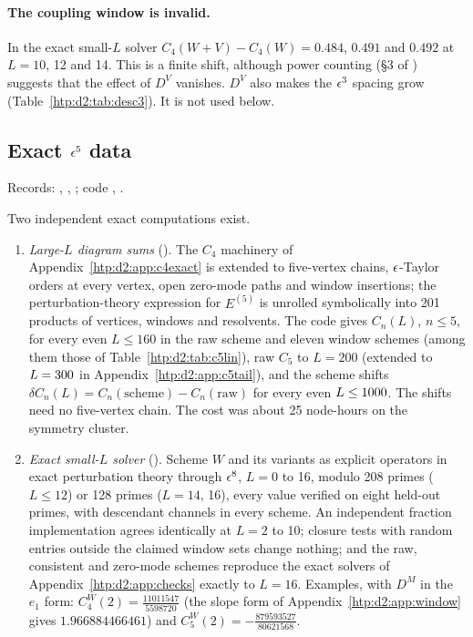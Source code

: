 \paragraph{The coupling window is invalid.} In the exact small-$L$ solver $C_4(W{+}V)-C_4(W)=0.484$, $0.491$ and $0.492$ at
$L=10$, 12 and 14. This is a finite shift, although power counting (\S3 of ) suggests that the effect
of $D^V$ vanishes. $D^V$ also makes the $\epsilon^3$ spacing grow (Table~\ref{htp:d2:tab:desc3}). It is
not used below.

\subsection{Exact \texorpdfstring{$\epsilon^5$}{eps5} data}\label{htp:d2:app:eps5data}
{\small\raggedright\noindent Records: ,
, ; code
, .\par}

Two independent exact computations exist.
\begin{enumerate}
\item \emph{Large-$L$ diagram sums} (). The $C_4$ machinery of Appendix~\ref{htp:d2:app:c4exact} is
 extended to five-vertex chains, $\epsilon$-Taylor orders at every vertex, open zero-mode paths and window insertions;
 the perturbation-theory expression for $E^{(5)}$ is unrolled symbolically into 201 products of vertices, windows and
 resolvents. The code gives $C_n(L)$, $n\le5$, for every even $L\le160$ in the raw scheme and eleven window schemes (among
 them those of Table~\ref{htp:d2:tab:c5lin}), raw $C_5$ to $L=200$ (extended to $L=300$ in
 Appendix~\ref{htp:d2:app:c5tail}), and the scheme shifts $\delta C_n(L)=C_n(\text{scheme})-C_n(\text{raw})$ for every even
 $L\le1000$. The shifts need no five-vertex chain. The cost was about 25 node-hours on the symmetry cluster.
\item \emph{Exact small-$L$ solver} (). Scheme $W$ and its variants as explicit operators in exact
 perturbation theory through $\epsilon^8$, $L=0$ to 16, modulo 208 primes ($L\le12$) or 128 primes ($L=14$, 16), every value
 verified on eight held-out primes, with descendant channels in every scheme. An independent fraction implementation agrees
 identically at $L=2$ to 10; closure tests with random entries outside the claimed window sets change nothing; and the raw,
 consistent and zero-mode schemes reproduce the exact solvers of Appendix~\ref{htp:d2:app:checks} exactly to $L=16$. Examples,
 with $D^M$ in the $e_1$ form: $C_4^W(2)=\frac{11011547}{5598720}$ (the slope form of Appendix~\ref{htp:d2:app:window} gives
 $1.966884466461$) and $C_5^W(2)=-\frac{879593527}{80621568}$.
\end{enumerate}

